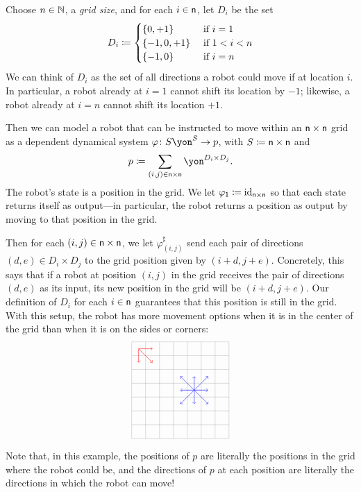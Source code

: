\documentclass[Book-Poly]{subfiles}
\begin{document}
\begin{example}\label{ex.grid_robot}
Choose $n\in\mathbb{N}$, a \emph{grid size}, and for each $i\in\mathsf{n}$, let $D_i$ be the set
\[
	D_i\coloneqq
	\begin{cases}
		\{0,+1\}&\textnormal{ if }i=1\\
		\{-1,0,+1\}&\textnormal{ if } 1<i<n\\
		\{-1,0\}&\textnormal{ if }i=n
	\end{cases}
\]
We can think of $D_i$ as the set of all directions a robot could move if at location $i$.
In particular, a robot already at $i=1$ cannot shift its location by $-1$; likewise, a robot already at $i=n$ cannot shift its location $+1$.

Then we can model a robot that can be instructed to move within an $\mathsf{n}\times\mathsf{n}$ grid as a dependent dynamical system $\varphi\colon S\yon^S\to p$, with $S\coloneqq\mathsf{n}\times\mathsf{n}$ and
\[
    p\coloneqq\sum_{(i,j)\in\ord{n}\times\ord{n}}\yon^{D_i\times D_j}.
\]
The robot's state is a position in the grid.
We let $\varphi_{\textsf{1}}\coloneqq\mathrm{id}_{\mathsf{n}\times\mathsf{n}}$ so that each state returns itself as output---in particular, the robot returns a position as output by moving to that position in the grid.

Then for each $(i,j)\in\mathsf{n}\times\mathsf{n}$, we let $\varphi^\sharp_{(i,j)}$ send each pair of directions $(d,e)\in D_i\times D_j$ to the grid position given by $(i+d,j+e)$.
Concretely, this says that if a robot at position $(i,j)$ in the grid receives the pair of directions $(d,e)$ as its input, its new position in the grid will be $(i+d,j+e)$.
Our definition of $D_i$ for each $i\in\mathsf{n}$ guarantees that this position is still in the grid.
With this setup, the robot has more movement options when it is in the center of the grid than when it is on the sides or corners:
\[
\begin{tikzpicture}[scale=.5]
  \draw[step=1cm,gray,very thin] (-3,-3) grid (4,4);
	\draw[->, red ] (-2.5,3.5) -- (-1.5, 3.5);
	\draw[->, red ] (-2.5,3.5) -- (-1.5, 2.5);
	\draw[->, red ] (-2.5,3.5) -- (-2.5, 2.5);
	\draw[->, blue] (1.5, 0.5) -- (0.5, 0.5);
	\draw[->, blue] (1.5, 0.5) -- (2.5, 0.5);
	\draw[->, blue] (1.5, 0.5) -- (1.5, 1.5);
	\draw[->, blue] (1.5, 0.5) -- (1.5,-0.5);
	\draw[->, blue] (1.5, 0.5) -- (0.5, 1.5);
	\draw[->, blue] (1.5, 0.5) -- (0.5,-0.5);
	\draw[->, blue] (1.5, 0.5) -- (2.5, 1.5);
	\draw[->, blue] (1.5, 0.5) -- (2.5,-0.5);
\end{tikzpicture}
\]

Note that, in this example, the positions of $p$ are literally the positions in the grid where the robot could be, and the directions of $p$ at each position are literally the directions in which the robot can move!
\end{example}
\end{document}
